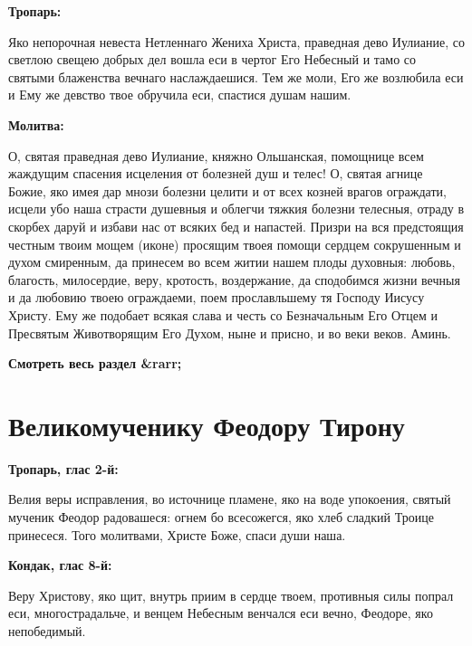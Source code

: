 \bfseries Тропарь:\normalfont{}


Яко непорочная невеста Нетленнаго Жениха Христа, праведная дево Иулиание,  со светлою свещею добрых дел вошла еси в чертог Его Небесный и тамо со святыми блаженства вечнаго наслаждаешися. Тем же моли, Его же возлюбила еси и Ему же девство твое обручила еси, спастися душам нашим.


\medskip


\bfseries Молитва:\normalfont{}


О, святая праведная дево Иулиание, княжно Ольшанская, помощнице всем жаждущим спасения исцеления от болезней душ и телес! О, святая агнице Божие, яко имея дар мнози болезни целити и от всех козней врагов ограждати, исцели убо наша страсти душевныя и облегчи тяжкия болезни телесныя, отраду в скорбех даруй и избави нас от всяких бед и напастей. Призри на вся предстоящия честным твоим мощем (иконе) просящим твоея помощи сердцем сокрушенным и духом смиренным, да принесем во всем житии нашем плоды духовныя: любовь, благость, милосердие, веру, кротость, воздержание, да сподобимся жизни вечныя и да любовию твоею ограждаеми, поем прославльшему тя Господу Иисусу Христу. Ему же подобает всякая слава и честь со Безначальным Его Отцем и Пресвятым Животворящим Его Духом, ныне и присно, и во веки веков. Аминь.


\mychapterending


\bfseries Смотреть весь раздел &rarr;\normalfont{} 

\section{Великомученику Феодору Тирону}
 


\bfseries Тропарь, глас 2-й:\normalfont{}


Велия веры исправления, во источнице пламене, яко на воде упокоения, святый мученик Феодор радовашеся: огнем бо всесожегся, яко хлеб сладкий Троице принесеся. Того молитвами, Христе Боже, спаси души наша.


\medskip


\bfseries Кондак, глас 8-й:\normalfont{}


Веру Христову, яко щит, внутрь приим в сердце твоем, противныя силы попрал еси, многострадальче, и венцем Небесным венчался еси вечно, Феодоре, яко непобедимый.


